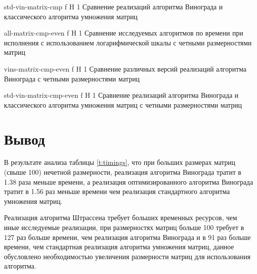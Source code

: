 {std-vin-matrix-cmp} %
{f} %
{H} %
{1\textwidth} %
{Сравнение реализаций алгоритма Винограда и классического алгоритма умножения матриц} %


{all-matrix-cmp-even} %
{f} %
{H} %
{1\textwidth} %
{Сравнение исследуемых алгоритмов по времени при исполнения с использованием логарифмической шкалы с четными размерностями матриц} %

{vins-matrix-cmp-even} %
{f} %
{H} %
{1\textwidth} %
{Сравнение различных версий реализаций алгоритма Винограда с четными размерностями матриц} %

{std-vin-matrix-cmp-even} %
{f} %
{H} %
{1\textwidth} %
{Сравнение реализаций алгоритма Винограда и классического алгоритма умножения матриц с четными размерностями матриц} %







\section*{Вывод}
В результате анализа таблицы \ref{t:timings}, что при больших размерах матриц (свыше 100) нечетной размерности, реализация алгоритма Винограда тратит в  1.38 раза меньше времени, а реализация  оптимизированного алгоритма Винограда тратит  в 1.56 раз меньше времени чем реализация стандартного алгоритма умножения матриц.



Реализация алгоритма Штрассена требует больших временных ресурсов, чем иные исследуемые реализации, при размерностях матриц больше 100 требует в 127 раз больше времени, чем реализация алгоритма Винограда и в 91 раз больше времени, чем стандартная реализация алгоритма умножения матриц, данное обусловлено необходимостью увеличения размерности матриц для использования алгоритма.

